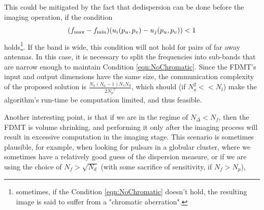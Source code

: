 \documentclass[iop]{emulateapj}
\begin{document}
This could be mitigated by the fact that dedispersion can be done before the imaging operation, if the condition 
\begin{equation}\label{eqn:NoChromatic}
(f_{\rm max} - f_{\rm min}) (u_i(p_u,p_v)-u_j(p_u,p_v)) < 1
\end{equation}
holds\footnote{sometimes, if the Condition \ref{eqn:NoChromatic} doesn't hold, the resulting image is said to suffer from a "chromatic aberration".}.
If the band is wide, this condition will not hold for pairs of far away antennas.
In this case, it is necessary to split the frequencies into sub-bands that are narrow enough to maintain Condition \ref{eqn:NoChromatic}.
Since the FDMT's input and output dimensions have the same size, the communication complexity of the proposed solution is $\frac{N_a(N_a-1){N_{s}}{N_{d}}}{2{N_{p}}^2}$, which should (if $N_a^2 << N_l$) make the algorithm's run-time be computation limited, and thus feasible.

Another interesting point, is that if we are in the regime of ${N_{\Delta}}<{N_{f}}$, then the FDMT is volume shrinking, and performing it only after the imaging process will result in excessive computation in the imaging stage. 
This scenario is sometimes plausible, for example, when looking for pulsars in a globular cluster, where we sometimes have a relatively good guess of the dispersion measure, or if we are using the choice of ${N_{f}}>\sqrt{{N_{d}}}$ (with some sacrifice of sensitivity, if ${N_{f}}>{N_{p}}$), 
\end{document}
